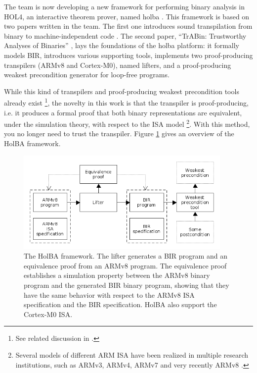 \documentclass{kththesis}
\begin{document}
The team is now developing a new framework for performing binary analysis in HOL4, an interactive theorem prover, named \gls{holba} \cite{noauthor_holba_2019}. This framework is based on two papers written in the team. The first one introduces sound \gls{transpilation} from binary to machine-independent code \footnotemark \cite{metere_sound_2017}. The second paper, ``TrABin: Trustworthy Analyses of Binaries'' \cite{lindner_trabin:_2019}, lays the foundations of the \gls{holba} platform: it formally models \gls{BIR}, introduces various supporting tools, implements two \gls{proof-producing} \glspl{transpiler} (ARMv8 and Cortex-M0), named lifters, and a proof-producing weakest precondition generator for loop-free programs.


While this kind of \glspl{transpiler} and \gls{proof-producing}
weakest precondition tools already exist \footnote{See related discussion in \cite{lindner_trabin:_2019}.}, the novelty in this work is that the transpiler is proof-producing, i.e. it produces a formal proof that both binary representations are equivalent, under the simulation theory, with respect to the \gls{ISA} model \footnote{Several models of different ARM \gls{ISA} have been realized in multiple research institutions, such as ARMv3, ARMv4, ARMv7 \cite{noauthor_canonical_2019, hutchison_trustworthy_2010} and very recently ARMv8 \cite{armstrong_isa_2019}.}. With this method, you no longer need to trust the transpiler. Figure \ref{holba-overview} gives an overview of the HolBA framework.

\begin{figure}[ht]
	\includegraphics[height=5cm]{figures/holba-overview.png}
	\centering
	\caption{The HolBA framework. The lifter generates a BIR program and an equivalence proof from an ARMv8 program. The equivalence proof establishes a simulation property between the ARMv8 binary program and the generated BIR binary program, showing that they have the same behavior with respect to the ARMv8 \gls{ISA} specification and the BIR specification. HolBA also support the Cortex-M0 ISA.}
	\label{holba-overview}
\end{figure}
\end{document}
